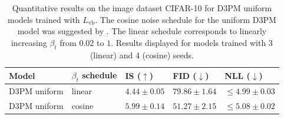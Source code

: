 \begin{table}[h!]
  \caption{Quantitative results on the image dataset CIFAR-10 for D3PM uniform models trained with $L_{\mathrm{vb}}$. The cosine noise schedule for the uniform D3PM model was suggested by \citet{hoogeboom2021argmax}. The linear schedule corresponds to linearly increasing $\beta_t$ from $0.02$ to $1$. Results displayed for models trained with 3 (linear) and 4 (cosine) seeds.}
  \label{tab:appendix_cifar10}
  \small
  \centering
  \begin{tabular}{lllll}
    \toprule
    Model & $\beta_t$ schedule  & IS ($\uparrow$)    & FID ($\downarrow$) & NLL ($\downarrow$) \\
    \midrule
    D3PM uniform  & linear & $4.44 \pm 0.05$ &  $79.86 \pm 1.64$ & $\leq 4.99 \pm 0.03$ \\
    D3PM uniform & cosine & $5.99 \pm 0.14$  &  $51.27 \pm 2.15$ & $\leq 5.08 \pm 0.02$  \\
    \bottomrule
  \end{tabular}
\end{table}